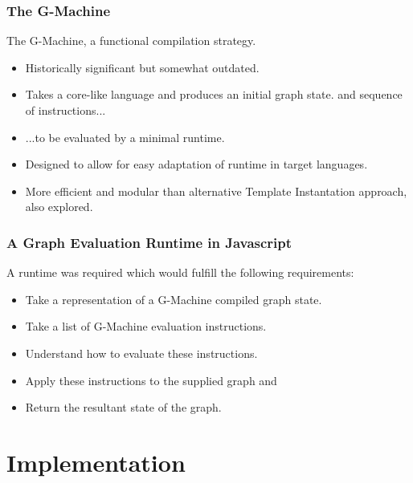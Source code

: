 \documentclass{beamer}
\begin{document}
\begin{frame}
	\frametitle{The G-Machine}

	The G-Machine, a functional compilation strategy.
	\begin{itemize}
		\item Historically significant but somewhat outdated.
		\item Takes a core-like language and produces an initial
			  graph state.
			  and sequence of instructions...
		\item ...to be evaluated by a minimal runtime.
		\item Designed to allow for easy adaptation of runtime
			  in target languages.
		\item More efficient and modular than alternative Template
			  Instantation approach, also explored.
	\end{itemize}
	
\end{frame}
	
\begin{frame}
	\frametitle{A Graph Evaluation Runtime in Javascript}
	A runtime was required which would fulfill the following
	requirements:
	\begin{itemize}
		\item Take a representation of a G-Machine compiled
			  graph state.
		\item Take a list of G-Machine evaluation instructions.
		\item Understand how to evaluate these instructions.
		\item Apply these instructions to the supplied graph and
		\item Return the resultant state of the graph.
	\end{itemize}	
	
\end{frame}

\section{Implementation}
\end{document}
